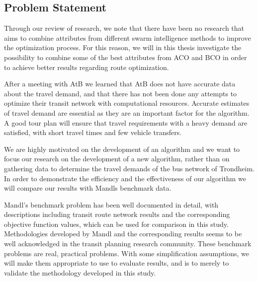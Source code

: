 \subsection{Problem Statement}

Through our review of research, we note that there have been no research that aims to combine attributes from different swarm intelligence methods to improve the optimization process. For this reason, we will in this thesis investigate the possibility to combine some of the best attributes from ACO and BCO in order to achieve better results regarding route optimization.

After a meeting with AtB we learned that AtB does not have accurate data about the travel demand, and that there has not been done any attempts to optimize their transit network with computational resources. Accurate estimates of travel demand are essential as they are an important factor for the algorithm. A good tour plan will ensure that travel requirements with a heavy demand are satisfied, with short travel times and few vehicle transfers. 

We are highly motivated on the development of an algorithm and we want to focus our research on the development of a new algorithm, rather than on gathering data to determine the travel demands of the bus network of Trondheim. In order to demonstrate the efficiency and the effectiveness of our algorithm we will compare our results with Mandls benchmark data. 

Mandl's benchmark problem has been well documented in detail, with descriptions including transit route network results and the corresponding objective function values, which can be used for comparison in this study. Methodologies developed by Mandl and the corresponding results seems to be well acknowledged in the transit planning research community. These benchmark problems are real, practical problems. With some simplification assumptions, we will make them appropriate to use to evaluate results, and is to merely to validate the methodology developed in this study. 

